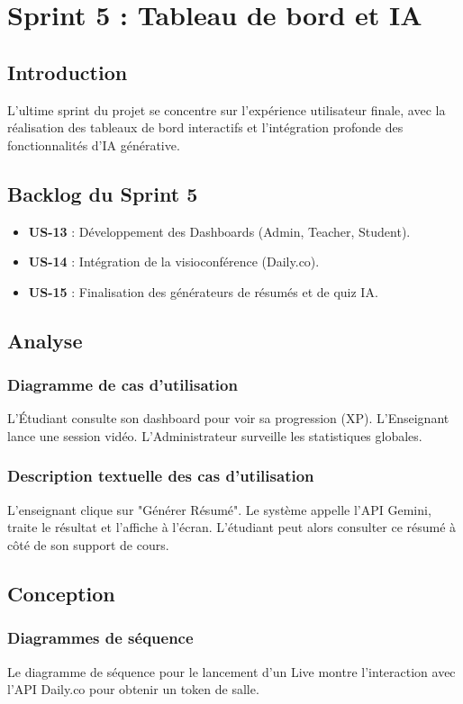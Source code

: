 \chapter{Sprint 5 : Tableau de bord et IA}

\section{Introduction}
L'ultime sprint du projet se concentre sur l'expérience utilisateur finale, avec la réalisation des tableaux de bord interactifs et l'intégration profonde des fonctionnalités d'IA générative.

\section{Backlog du Sprint 5}
\begin{itemize}
    \item \textbf{US-13} : Développement des Dashboards (Admin, Teacher, Student).
    \item \textbf{US-14} : Intégration de la visioconférence (Daily.co).
    \item \textbf{US-15} : Finalisation des générateurs de résumés et de quiz IA.
\end{itemize}

\section{Analyse}
\subsection{Diagramme de cas d'utilisation}
L'Étudiant consulte son dashboard pour voir sa progression (XP). L'Enseignant lance une session vidéo. L'Administrateur surveille les statistiques globales.

\subsection{Description textuelle des cas d'utilisation}
L'enseignant clique sur "Générer Résumé". Le système appelle l'API Gemini, traite le résultat et l'affiche à l'écran. L'étudiant peut alors consulter ce résumé à côté de son support de cours.

\section{Conception}
\subsection{Diagrammes de séquence}
Le diagramme de séquence pour le lancement d'un Live montre l'interaction avec l'API Daily.co pour obtenir un token de salle.


